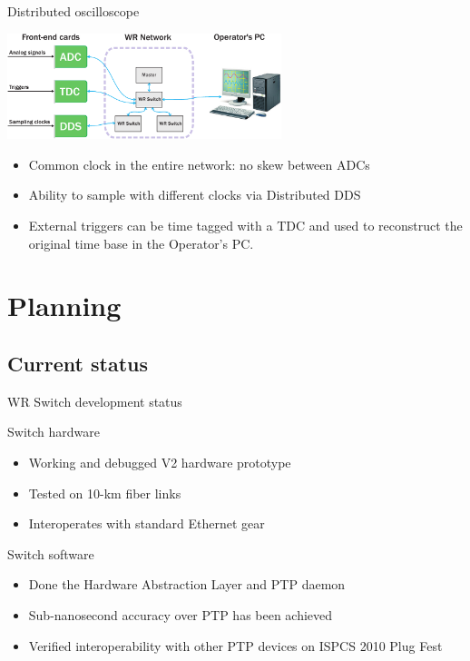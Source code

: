 \documentclass[xcolor=dvipsnames]{beamer}
\begin{document}
\begin{frame}{Distributed oscilloscope}
  \begin{center}
    \includegraphics[width=8cm]{../../figures/applications/distr_oscill}
    \end{center}
    \begin{block}{}
      \begin{itemize}
      \item Common clock in the entire network: no skew between ADCs
      \item Ability to sample with different clocks via Distributed DDS
      \item External triggers can be time tagged with a TDC and used to reconstruct the original time base in the Operator's PC.
      \end{itemize}
    \end{block}
\end{frame}



\section{Planning}

\subsection{Current status}

\begin{frame}{WR Switch development status}
	\begin{block}{Switch hardware}
          \begin{itemize}
            \item Working and debugged V2 hardware prototype
            \item Tested on 10-km fiber links
            \item Interoperates with standard Ethernet gear
            \end{itemize}
            \end{block}

	\begin{block}{Switch software}
          \begin{itemize}
            \item Done the Hardware Abstraction Layer and PTP daemon 
            \item Sub-nanosecond accuracy over PTP has been achieved
            \item Verified interoperability with other PTP devices on ISPCS 2010 Plug Fest
            \end{itemize}
          \end{block}
\end{frame}
\end{document}
